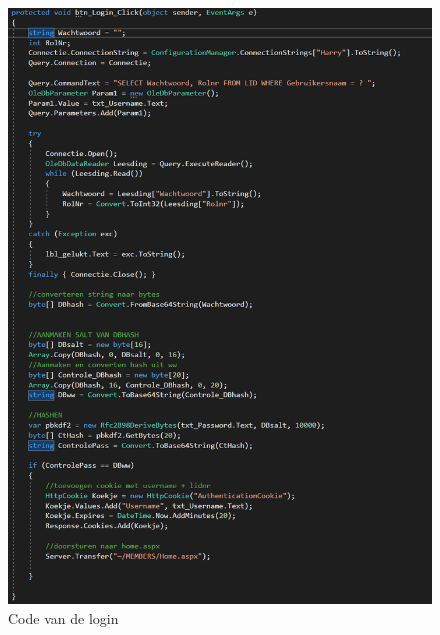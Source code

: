 \documentclass[11pt]{article}
\begin{document}
	\begin{figure}[h]
		\includegraphics[scale=0.8]{CodeLogin}
		\caption{Code van de login}
		\label{LoginCode}
	\end{figure}
	\newpage
	
\end{document}
